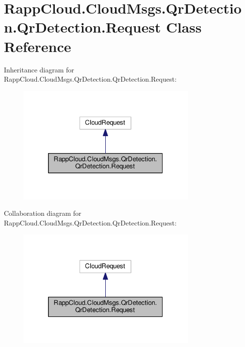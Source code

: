 \hypertarget{classRappCloud_1_1CloudMsgs_1_1QrDetection_1_1QrDetection_1_1Request}{\section{Rapp\-Cloud.\-Cloud\-Msgs.\-Qr\-Detection.\-Qr\-Detection.\-Request Class Reference}
\label{classRappCloud_1_1CloudMsgs_1_1QrDetection_1_1QrDetection_1_1Request}
}


Inheritance diagram for Rapp\-Cloud.\-Cloud\-Msgs.\-Qr\-Detection.\-Qr\-Detection.\-Request\-:
\nopagebreak
\begin{figure}[H]
\begin{center}
\leavevmode
\includegraphics[width=254pt]{classRappCloud_1_1CloudMsgs_1_1QrDetection_1_1QrDetection_1_1Request__inherit__graph}
\end{center}
\end{figure}


Collaboration diagram for Rapp\-Cloud.\-Cloud\-Msgs.\-Qr\-Detection.\-Qr\-Detection.\-Request\-:
\nopagebreak
\begin{figure}[H]
\begin{center}
\leavevmode
\includegraphics[width=254pt]{classRappCloud_1_1CloudMsgs_1_1QrDetection_1_1QrDetection_1_1Request__coll__graph}
\end{center}
\end{figure}
